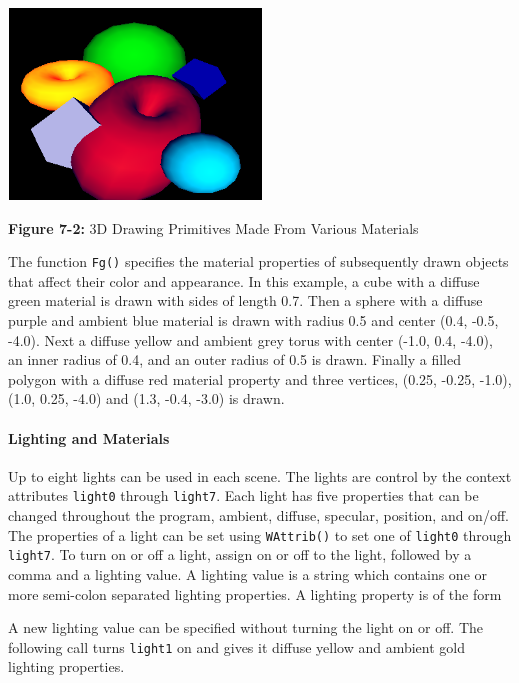 \begin{center}
\includegraphics[width=2.65in,height=2.0in]{ub-img/ub-img32.png} 

{\sffamily\bfseries Figure 7-2:}
{\sffamily 3D Drawing Primitives Made From Various Materials}
\end{center}

The function \texttt{Fg()} specifies the material properties of 
subsequently drawn objects that affect their color and appearance.
In this example, a cube with a diffuse green material is
drawn with sides of length 0.7. Then a sphere with a diffuse purple and
ambient blue material is drawn with radius 0.5 and center (0.4, -0.5,
-4.0). Next a diffuse yellow and ambient grey torus with center (-1.0,
0.4, -4.0), an inner radius of 0.4, and an outer radius of 0.5 is
drawn. Finally a filled polygon with a diffuse red material property
and three vertices, (0.25, -0.25, -1.0), (1.0, 0.25, -4.0) and
(1.3, -0.4, -3.0) is drawn. 

\paragraph{Lighting and Materials}
Up to eight lights can be used in each scene. The
lights are control by the context attributes \texttt{light0} through
\texttt{light7}.
Each light has five properties that can be changed throughout the
program, ambient, diffuse, specular, position, and on/off. The
properties of a light can be set using \texttt{WAttrib()} to set one of
\texttt{light0} through \texttt{light7}. To turn on or off a light,
assign on or off to the light, followed by a comma and a lighting value.
A lighting value is a string which contains one or more semi-colon
separated lighting properties. A lighting property is of the form


\noindent
A new lighting value can be specified without turning the light on or off.
The following call turns \texttt{light1} on and gives it diffuse
yellow and ambient gold lighting properties. 

